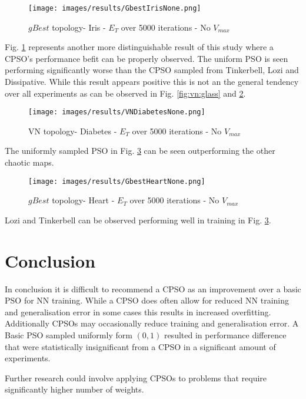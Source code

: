 \documentclass[conference]{IEEEtran}
\begin{document}
\begin{figure}[htbp]
\centerline{\texttt{[image: images/results/GbestIrisNone.png]}}
\caption{$gBest$ topology- Iris - $ E_T $ over 5000 iterations - No $ V_{max} $}
\label{fig:gbest:iris}
\end{figure}

Fig. \ref{fig:gbest:iris} represents another more distinguishable result of this study where a \ac{CPSO}'s performance befit can be properly observed. The uniform \ac{PSO} is seen performing significantly worse than the \ac{CPSO} sampled from Tinkerbell, Lozi and Dissipative. While this result appears positive this is not an the general tendency over all experiments as can be observed in Fig. \ref{fig:vn:glass} and \ref{fig:vn:diabetes}.

\begin{figure}[htbp]
\centerline{\texttt{[image: images/results/VNDiabetesNone.png]}}
\caption{\ac{VN} topology- Diabetes - $ E_T $ over 5000 iterations - No $ V_{max} $}
\label{fig:vn:diabetes}
\end{figure}

The uniformly sampled \ac{PSO} in Fig. \ref{fig:gbest:heart} can be seen outperforming the other chaotic maps.

\begin{figure}[htbp]
\centerline{\texttt{[image: images/results/GbestHeartNone.png]}}
\caption{$gBest$ topology- Heart - $ E_T $ over 5000 iterations - No $ V_{max} $}
\label{fig:gbest:heart}
\end{figure}

Lozi and Tinkerbell can be observed performing well in training in Fig. \ref{fig:gbest:heart}.

\newpage
\section{Conclusion}
In conclusion it is difficult to recommend a \ac{CPSO} as an improvement over a basic \ac{PSO} for \ac{NN} training. While a \ac{CPSO} does often allow for reduced \ac{NN} training and generalisation error in some cases this results in increased overfitting. Additionally \ac{CPSO}s may occasionally reduce training and generalisation error. A Basic \ac{PSO} sampled uniformly form $ (0, 1) $ resulted in performance difference that were statistically insignificant from a \ac{CPSO} in a significant amount of experiments.

Further research could involve applying \ac{CPSO}s to problems that require significantly higher number of weights.

\newpage

\nocite{*}
\noindent

\indent

\end{document}
